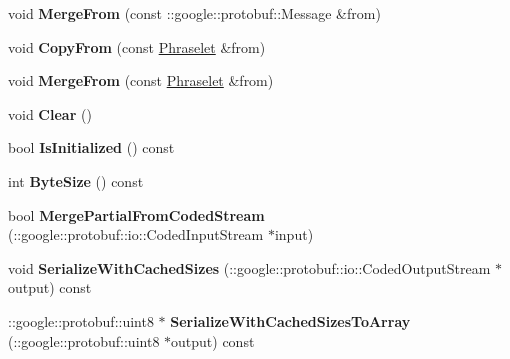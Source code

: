 \begin{DoxyCompactItemize}
\item 
\hypertarget{classlattice_1_1Phraselet_a381bcf822ebd538c59bf795dee2b77d9}{
void {\bfseries MergeFrom} (const ::google::protobuf::Message \&from)}
\label{classlattice_1_1Phraselet_a381bcf822ebd538c59bf795dee2b77d9}

\item 
\hypertarget{classlattice_1_1Phraselet_aa8bc3ab3f900bfdff4a4134031218fc3}{
void {\bfseries CopyFrom} (const \hyperlink{classlattice_1_1Phraselet}{Phraselet} \&from)}
\label{classlattice_1_1Phraselet_aa8bc3ab3f900bfdff4a4134031218fc3}

\item 
\hypertarget{classlattice_1_1Phraselet_aea4c86bf72b788b9afec402442f963df}{
void {\bfseries MergeFrom} (const \hyperlink{classlattice_1_1Phraselet}{Phraselet} \&from)}
\label{classlattice_1_1Phraselet_aea4c86bf72b788b9afec402442f963df}

\item 
\hypertarget{classlattice_1_1Phraselet_a380c5bf45d45269bc0ec61e80c4df34e}{
void {\bfseries Clear} ()}
\label{classlattice_1_1Phraselet_a380c5bf45d45269bc0ec61e80c4df34e}

\item 
\hypertarget{classlattice_1_1Phraselet_aa25d46e3d15cb431d4a7cf30c8ad5bdb}{
bool {\bfseries IsInitialized} () const }
\label{classlattice_1_1Phraselet_aa25d46e3d15cb431d4a7cf30c8ad5bdb}

\item 
\hypertarget{classlattice_1_1Phraselet_a6b23edd221a64e6553d042f45df86e73}{
int {\bfseries ByteSize} () const }
\label{classlattice_1_1Phraselet_a6b23edd221a64e6553d042f45df86e73}

\item 
\hypertarget{classlattice_1_1Phraselet_af794c511c8d6be67e141a790ce18ef6f}{
bool {\bfseries MergePartialFromCodedStream} (::google::protobuf::io::CodedInputStream $\ast$input)}
\label{classlattice_1_1Phraselet_af794c511c8d6be67e141a790ce18ef6f}

\item 
\hypertarget{classlattice_1_1Phraselet_a00627ab143b2b8d5fcbdc686b2496230}{
void {\bfseries SerializeWithCachedSizes} (::google::protobuf::io::CodedOutputStream $\ast$output) const }
\label{classlattice_1_1Phraselet_a00627ab143b2b8d5fcbdc686b2496230}

\item 
\hypertarget{classlattice_1_1Phraselet_a860e35d01a5c802dc73aed146a6921ef}{
::google::protobuf::uint8 $\ast$ {\bfseries SerializeWithCachedSizesToArray} (::google::protobuf::uint8 $\ast$output) const }
\label{classlattice_1_1Phraselet_a860e35d01a5c802dc73aed146a6921ef}


\end{DoxyCompactItemize}
